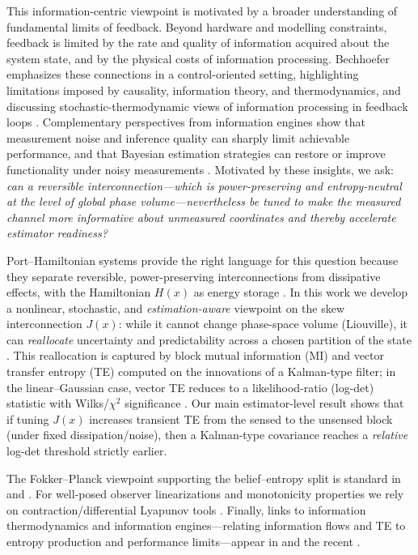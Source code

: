\documentclass[final,5p,times,twocolumn]{elsarticle}
\begin{document}
	This information-centric viewpoint is motivated by a broader understanding of fundamental limits of feedback. Beyond hardware and modelling constraints, feedback is limited by the rate and quality of information acquired about the system state, and by the physical costs of information processing. Bechhoefer emphasizes these connections in a control-oriented setting, highlighting limitations imposed by causality, information theory, and thermodynamics, and discussing stochastic-thermodynamic views of information processing in feedback loops \citep{Bechhoefer2021CTP}. Complementary perspectives from information engines show that measurement noise and inference quality can sharply limit achievable performance, and that Bayesian estimation strategies can restore or improve functionality under noisy measurements \citep{duBuisson2024_APX,PatronCastro2026_PRL}. Motivated by these insights, we ask: \emph{can a reversible interconnection---which is power-preserving and entropy-neutral at the level of global phase volume---nevertheless be tuned to make the measured channel more informative about unmeasured coordinates and thereby accelerate estimator readiness?}
	
	Port--Hamiltonian systems provide the right language for this question because they separate reversible, power-preserving interconnections from dissipative effects, with the Hamiltonian $H(x)$ as energy storage \citep{vanDerSchaftJeltsema2014}. In this work we develop a nonlinear, stochastic, and \emph{estimation-aware} viewpoint on the skew interconnection $J(x)$: while it cannot change phase-space volume (Liouville), it can \emph{reallocate} uncertainty and predictability across a chosen partition of the state \citep[Sec.~9]{Arnold1989}. This reallocation is captured by block mutual information (MI) and vector transfer entropy (TE) computed on the innovations of a Kalman-type filter; in the linear--Gaussian case, vector TE reduces to a likelihood-ratio (log-det) statistic with Wilks/$\chi^2$ significance \citep{Barnett2009_PRL}. Our main estimator-level result shows that if tuning $J(x)$ increases transient TE from the sensed to the unsensed block (under fixed dissipation/noise), then a Kalman-type covariance reaches a \emph{relative} log-det threshold strictly earlier.
	
	 The Fokker--Planck viewpoint supporting the belief--entropy split is standard in \citep[Ch.~5]{Risken1996} and \citep[Ch.~4]{Gardiner2009}. For well-posed observer linearizations and monotonicity properties we rely on contraction/differential Lyapunov tools \citep{LohmillerSlotine1998,ForniSepulchre2014_TAC}. Finally, links to information thermodynamics and information engines---relating information flows and TE to entropy production and performance limits---appear in \citep{Allahverdyan2009_JSTAT} and the recent \citep{duBuisson2024_APX,PatronCastro2026_PRL}.
\end{document}
